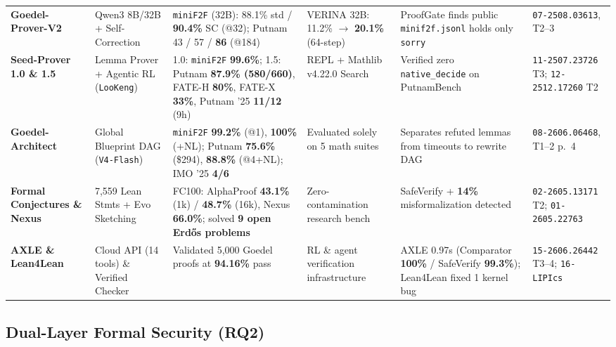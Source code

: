 \documentclass[10pt,twocolumn]{article}
\begin{document}
\begin{table}[tp]
\begin{tabularx}{\textwidth}{L{2.3cm} L{2.4cm} L{3.6cm} L{2.3cm} Y L{2.2cm}}
    \textbf{Goedel-Prover-V2}~\cite{lin2026goedelproverv2} & Qwen3 8B/32B + Self-Correction & \texttt{miniF2F} (32B): 88.1\% std / \textbf{90.4\%} SC (@32); Putnam 43 / 57 / \textbf{86} (@184) & VERINA 32B: 11.2\% $\to$ \textbf{20.1\%} (64-step)~\cite{ye2026verina} & ProofGate finds public \texttt{minif2f.jsonl} holds only \texttt{sorry}~\cite{yang2026proofgate} & \texttt{07-2508.03613}, T2--3 \\
    \textbf{Seed-Prover 1.0 \& 1.5}~\cite{chen2025seedprover,chen2025seedprover15} & Lemma Prover + Agentic RL (\texttt{LooKeng}) & 1.0: \texttt{miniF2F} \textbf{99.6\%}; 1.5: Putnam \textbf{87.9\% (580/660)}, FATE-H \textbf{80\%}, FATE-X \textbf{33\%}, Putnam '25 \textbf{11/12} (9h) & REPL + Mathlib v4.22.0 Search & Verified zero \texttt{native\_decide} on PutnamBench & \texttt{11-2507.23726} T3; \texttt{12-2512.17260} T2 \\
    \textbf{Goedel-Architect}~\cite{chung2026goedelarchitect} & Global Blueprint DAG (\texttt{V4-Flash}) & \texttt{miniF2F} \textbf{99.2\%} (@1), \textbf{100\%} (+NL); Putnam \textbf{75.6\%} (\$294), \textbf{88.8\%} (@4+NL); IMO '25 \textbf{4/6} & Evaluated solely on 5 math suites & Separates refuted lemmas from timeouts to rewrite DAG & \texttt{08-2606.06468}, T1--2 p.~4 \\
    \textbf{Formal Conjectures \& Nexus}~\cite{tsoukalas2026nexus,firsching2026formalconjectures} & 7,559 Lean Stmts + Evo Sketching & FC100: AlphaProof \textbf{43.1\%} (1k) / \textbf{48.7\%} (16k), Nexus \textbf{66.0\%}; solved \textbf{9 open Erd\H{o}s problems} & Zero-contamination research bench & SafeVerify + \textbf{14\%} misformalization detected & \texttt{02-2605.13171} T2; \texttt{01-2605.22763} \\
    \textbf{AXLE \& Lean4Lean}~\cite{xin2026axle,carneiro2025lean4lean} & Cloud API (14 tools) \& Verified Checker & Validated 5,000 Goedel proofs at \textbf{94.16\%} pass & RL \& agent verification infrastructure & AXLE 0.97s (Comparator \textbf{100\%} / SafeVerify \textbf{99.3\%}); Lean4Lean fixed 1 kernel bug & \texttt{15-2606.26442} T3--4; \texttt{16-LIPIcs} \\
    \bottomrule
  \end{tabularx}
\end{table}

\subsection{Dual-Layer Formal Security (RQ2)}
\label{sec:rq2}
\end{document}
